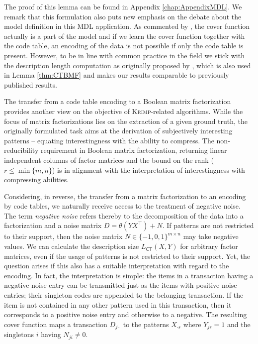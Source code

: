 The proof of this lemma can be found in Appendix \ref{chap:AppendixMDL}.
We remark that this formulation also puts new emphasis on the debate about the model definition in this MDL application. As commented by \cite{siebes2011structure}, the cover function actually is a part of the model and if we learn the cover function together with the code table, an encoding of the data is not possible if only the code table is present. 
However, to be in line with common practice in the field we stick with the description length computation as originally proposed by \cite{siebes2006item}, which is also used in Lemma \ref{thm:CTBMF} and makes our results comparable to previously published results.

The transfer from a code table encoding to a Boolean matrix factorization provides another view on the objective of \textsc{Krimp}-related algorithms. While the focus of matrix factorizations lies on the extraction of a given ground truth, the originally formulated task aims at the derivation of subjectively interesting patterns -- equating interestingness with the ability to compress. The non-reducibility requirement in Boolean matrix factorization, returning  linear independent columns of factor matrices and the bound on the rank ($r\leq\min\{m,n\}$) is in alignment with the interpretation of interestingness with compressing abilities.

Considering, in reverse, the transfer from a matrix factorization to an encoding by code tables, we naturally receive access to the treatment of negative noise. The term \emph{negative noise} refers thereby to the decomposition of the data into a factorization and a noise matrix $D=\theta(Y X^\top) +N$. If patterns are not restricted to their support, then the noise matrix $N\in\{-1,0,1\}^{m\times n}$ may take negative values. We can calculate the description size $L_{\mathsf{CT}}(X,Y)$ for arbitrary factor matrices, even if the usage of patterns is not restricted to their support. Yet, the question arises if this also has a suitable interpretation with regard to the encoding. In fact, the interpretation is simple: the items in a transaction having a negative noise entry can be transmitted just as the items with positive noise entries; their singleton codes are appended to the belonging transaction. If the item is not contained in any other pattern used in this transaction, then it corresponds to a positive noise entry and otherwise to a negative. The resulting cover function maps a transaction $D_{j\cdot}$ to the patterns $X_{\cdot s}$ where $Y_{js}=1$ and the singletons $i$ having $N_{ji}\neq 0$.

